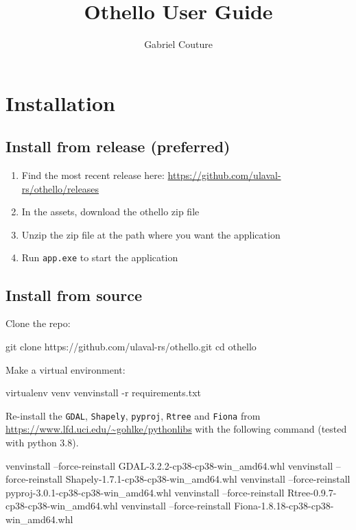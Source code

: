 \documentclass[11pt]{article}
\title{Othello User Guide}
\author{Gabriel Couture}
\begin{document}
\maketitle
\tableofcontents
\newpage

\section{Installation}\label{sec:installation}

\subsection{Install from release (preferred)}\label{subsec:install-from-release-(preferred)}
\begin{enumerate}
    \item Find the most recent release here: \url{https://github.com/ulaval-rs/othello/releases}
    \item In the assets, download the othello zip file
    \item Unzip the zip file at the path where you want the application
    \item Run \texttt{app.exe} to start the application
\end{enumerate}

\subsection{Install from source}\label{subsec:install-from-source}
Clone the repo:
\begin{code}
git clone https://github.com/ulaval-rs/othello.git
cd othello
\end{code}

\noindent Make a virtual environment:
\begin{code}
virtualenv venv
venv\Scripts\pip install -r requirements.txt
\end{code}

\noindent Re-install the \texttt{GDAL}, \texttt{Shapely}, \texttt{pyproj}, \texttt{Rtree} and \texttt{Fiona} from
\url{https://www.lfd.uci.edu/~gohlke/pythonlibs} with the following command (tested with python 3.8).
\begin{code}
venv\Scripts\pip install --force-reinstall GDAL-3.2.2-cp38-cp38-win_amd64.whl
venv\Scripts\pip install --force-reinstall Shapely-1.7.1-cp38-cp38-win_amd64.whl
venv\Scripts\pip install --force-reinstall pyproj-3.0.1-cp38-cp38-win_amd64.whl
venv\Scripts\pip install --force-reinstall Rtree-0.9.7-cp38-cp38-win_amd64.whl
venv\Scripts\pip install --force-reinstall Fiona-1.8.18-cp38-cp38-win_amd64.whl
\end{code}
\end{document}
